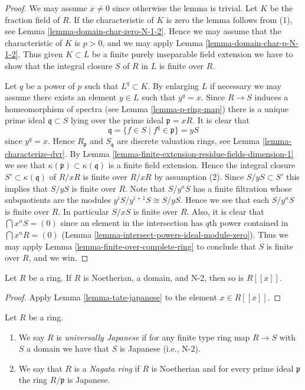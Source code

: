 \begin{proof}
We may assume $x \not = 0$ since otherwise the lemma is trivial.
Let $K$ be the fraction field of $R$. If the characteristic of $K$
is zero the lemma follows from (1), see
Lemma \ref{lemma-domain-char-zero-N-1-2}. Hence we may assume
that the characteristic of $K$ is $p > 0$, and we may apply
Lemma \ref{lemma-domain-char-p-N-1-2}. Thus given $K \subset L$
be a finite purely inseparable field extension we have to show
that the integral closure $S$ of $R$ in $L$ is finite over $R$.

\medskip\noindent
Let $q$ be a power of $p$ such that $L^q \subset K$.
By enlarging $L$ if necessary we may assume there exists
an element $y \in L$ such that $y^q = x$. Since $R \to S$
induces a homeomorphism of spectra (see Lemma \ref{lemma-p-ring-map})
there is a unique prime ideal $\mathfrak q \subset S$ lying
over the prime ideal $\mathfrak p = xR$. It is clear that
$$
\mathfrak q = \{f \in S \mid f^q \in \mathfrak p\} = yS
$$
since $y^q = x$. Hence $R_{\mathfrak p}$ and $S_{\mathfrak q}$
are discrete valuation rings, see Lemma \ref{lemma-characterize-dvr}.
By Lemma \ref{lemma-finite-extension-residue-fields-dimension-1} we
see that $\kappa(\mathfrak p) \subset \kappa(\mathfrak q)$ is
a finite field extension. Hence the integral closure
$S' \subset \kappa(\mathfrak q)$ of $R/xR$ is finite over
$R/xR$ by assumption (2). Since $S/yS \subset S'$ this implies
that $S/yS$ is finite over $R$. Note that $S/y^nS$ has a finite
filtration whose subquotients are the modules
$y^iS/y^{i + 1}S \cong S/yS$. Hence we see that each $S/y^nS$
is finite over $R$. In particular $S/xS$ is finite over $R$.
Also, it is clear that $\bigcap x^nS = (0)$ since an element
in the intersection has $q$th power contained in $\bigcap x^nR = (0)$
(Lemma \ref{lemma-intersect-powers-ideal-module-zero}).
Thus we may apply Lemma \ref{lemma-finite-over-complete-ring} to conclude
that $S$ is finite over $R$, and we win.
\end{proof}

\begin{lemma}
\label{lemma-power-series-over-N-2}
Let $R$ be a ring.
If $R$ is Noetherian, a domain, and N-2, then so is $R[[x]]$.
\end{lemma}

\begin{proof}
Apply Lemma \ref{lemma-tate-japanese} to the element $x \in R[[x]]$.
\end{proof}

\begin{definition}
\label{definition-nagata}
Let $R$ be a ring.
\begin{enumerate}
\item We say $R$ is {\it universally Japanese} if for any finite
type ring map $R \to S$ with $S$ a domain we have that $S$ is
Japanese (i.e., N-2).
\item We say that $R$ is a {\it Nagata ring} if $R$ is Noetherian and
for every prime ideal $\mathfrak p$ the ring $R/\mathfrak p$ is Japanese.
\end{enumerate}
\end{definition}

